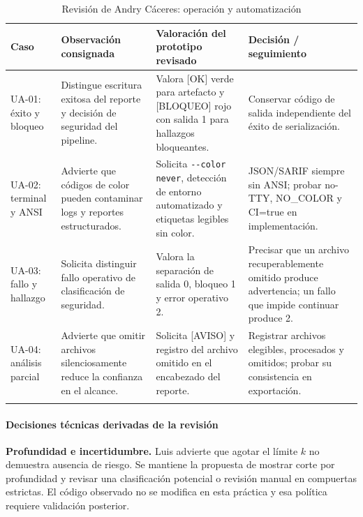 \begin{table}[H]
\centering\small{}
\caption{Revisión de Andry Cáceres: operación y automatización}
\begin{tabularx}{\textwidth}{P{2.3cm}YYP{3.1cm}}
\toprule
\textbf{Caso} & \textbf{Observación consignada} & \textbf{Valoración del prototipo revisado} & \textbf{Decisión / seguimiento} \\
\midrule
UA-01: éxito y bloqueo & Distingue escritura exitosa del reporte y decisión de seguridad del pipeline. & Valora [OK] verde para artefacto y [BLOQUEO] rojo con salida 1 para hallazgos bloqueantes. & Conservar código de salida independiente del éxito de serialización. \\
\addlinespace
UA-02: terminal y ANSI & Advierte que códigos de color pueden contaminar logs y reportes estructurados. & Solicita \texttt{-\allowbreak -\allowbreak color never}, detección de entorno automatizado y etiquetas legibles sin color. & JSON/SARIF siempre sin ANSI; probar no-TTY, NO\_COLOR y CI=true en implementación. \\
\addlinespace
UA-03: fallo y hallazgo & Solicita distinguir fallo operativo de clasificación de seguridad. & Valora la separación de salida 0, bloqueo 1 y error operativo 2. & Precisar que un archivo recuperablemente omitido produce advertencia; un fallo que impide continuar produce 2. \\
\addlinespace
UA-04: análisis parcial & Advierte que omitir archivos silenciosamente reduce la confianza en el alcance. & Solicita [AVISO] y registro del archivo omitido en el encabezado del reporte. & Registrar archivos elegibles, procesados y omitidos; probar su consistencia en exportación. \\
\addlinespace
\bottomrule
\end{tabularx}
\end{table}


\paragraph*{Decisiones técnicas derivadas de la revisión}
\textbf{Profundidad e incertidumbre.} Luis advierte que agotar el límite $k$ no demuestra ausencia de riesgo. Se mantiene la propuesta de mostrar corte por profundidad y revisar una clasificación potencial o revisión manual en compuertas estrictas. El código observado no se modifica en esta práctica y esa política requiere validación posterior.

